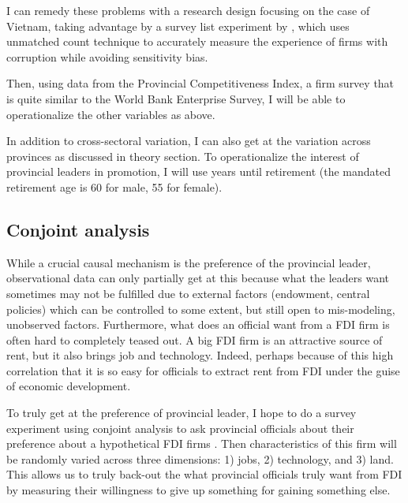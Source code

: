 \documentclass[12pt]{article}
\begin{document}
I can remedy these problems with a research design focusing on the case of Vietnam, taking advantage by a survey list experiment by \citet{Malesky2015}, which uses unmatched count technique to accurately measure the experience of firms with corruption while avoiding sensitivity bias.

Then, using data from the Provincial Competitiveness Index, a firm survey that is quite similar to the World Bank Enterprise Survey, I will be able to operationalize the other variables as above.

In addition to cross-sectoral variation, I can also get at the variation across provinces as discussed in theory section. To operationalize the interest of provincial leaders in promotion, I will use years until retirement (the mandated retirement age is 60 for male, 55 for female).

\subsection{Conjoint analysis}

While a crucial causal mechanism is the preference of the provincial leader, observational data can only partially get at this because what the leaders want sometimes may not be fulfilled due to external factors (endowment, central policies) which can be controlled to some extent, but still open to mis-modeling, unobserved factors. Furthermore, what does an official want from a FDI firm is often hard to completely teased out. A big FDI firm is an attractive source of rent, but it also brings job and technology. Indeed, perhaps because of this high correlation that it is so easy for officials to extract rent from FDI under the guise of economic development.

To truly get at the preference of provincial leader, I hope to do a survey experiment using conjoint analysis to ask provincial officials about their preference about a hypothetical FDI firms \citep{Hainmueller2014}. Then characteristics of this firm will be randomly varied across three dimensions: 1) jobs, 2) technology, and 3) land. This allows us to truly back-out the what provincial officials truly want from FDI by measuring their willingness to give up something for gaining something else.

\clearpage


\end{document}
